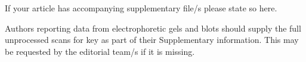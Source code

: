 \documentclass[pdflatex,sn-mathphys-num]{sn-jnl}%
\theoremstyle{thmstyleone}%
\theoremstyle{thmstyletwo}%
\theoremstyle{thmstylethree}%
\begin{document}







\backmatter


If your article has accompanying supplementary file/s please state so here. 

Authors reporting data from electrophoretic gels and blots should supply the full unprocessed scans for key as part of their Supplementary information. This may be requested by the editorial team/s if it is missing.
\end{document}
